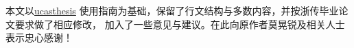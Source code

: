 \vspace*{\fill}
\begin{leftbar}
	\noindent{}本文以\href{https://github.com/mohuangrui/ucasthesis}{ucasthesis}
	使用指南为基础，保留了行文结构与多数内容，并按浙传毕业论文要求做了相应修改，
	加入了一些意见与建议。在此向原作者莫晃锐及相关人士表示忠心感谢！
\end{leftbar}
\vspace*{\fill}



